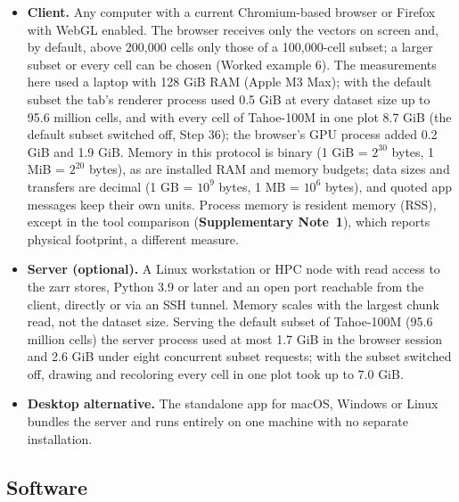 \begin{itemize}
\tightlist
\item
  \textbf{Client.} Any computer with a current Chromium-based browser or Firefox with WebGL enabled. The browser receives only the vectors on screen and, by default, above 200,000 cells only those of a 100,000-cell subset; a larger subset or every cell can be chosen (Worked example 6). The measurements here used a laptop with 128 GiB RAM (Apple M3 Max); with the default subset the tab's renderer process used 0.5 GiB at every dataset size up to 95.6 million cells, and with every cell of Tahoe-100M in one plot 8.7 GiB (the default subset switched off, Step 36); the browser's GPU process added 0.2 GiB and 1.9 GiB. Memory in this protocol is binary (1 GiB = $2^{30}$ bytes, 1 MiB = $2^{20}$ bytes), as are installed RAM and memory budgets; data sizes and transfers are decimal (1 GB = $10^9$ bytes, 1 MB = $10^6$ bytes), and quoted app messages keep their own units. Process memory is resident memory (RSS), except in the tool comparison (\textbf{Supplementary Note~1}), which reports physical footprint, a different measure. %
\item
  \textbf{Server (optional).} A Linux workstation or HPC node with read access to the zarr stores, Python 3.9 or later and an open port reachable from the client, directly or via an SSH tunnel. Memory scales with the largest chunk read, not the dataset size. Serving the default subset of Tahoe-100M (95.6 million cells) the server process used at most 1.7 GiB in the browser session and 2.6 GiB under eight concurrent subset requests; with the subset switched off, drawing and recoloring every cell in one plot took up to 7.0 GiB.
\item
  \textbf{Desktop alternative.} The standalone app for macOS, Windows or Linux bundles the server and runs entirely on one machine with no separate installation.
\end{itemize}

\subsection{Software}

